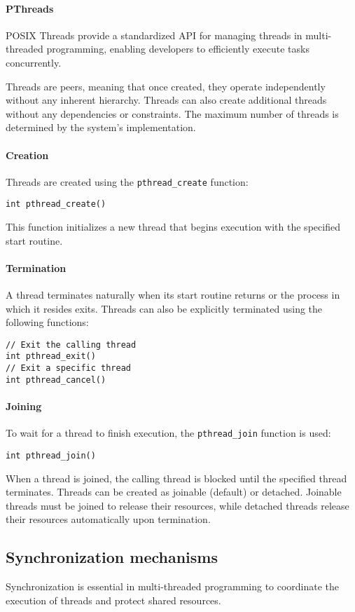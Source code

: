 \paragraph*{PThreads}
POSIX Threads provide a standardized API for managing threads in multi-threaded programming, enabling developers to efficiently execute tasks concurrently.

Threads are peers, meaning that once created, they operate independently without any inherent hierarchy. 
Threads can also create additional threads without any dependencies or constraints. 
The maximum number of threads is determined by the system's implementation.

\paragraph*{Creation}
Threads are created using the \texttt{pthread\_create} function:
\begin{lstlisting}[style=C]
int pthread_create()
\end{lstlisting}
This function initializes a new thread that begins execution with the specified start routine.

\paragraph*{Termination}
A thread terminates naturally when its start routine returns or the process in which it resides exits. 
Threads can also be explicitly terminated using the following functions:
\begin{lstlisting}[style=C]
// Exit the calling thread
int pthread_exit()
// Exit a specific thread
int pthread_cancel()
\end{lstlisting}

\paragraph*{Joining}
To wait for a thread to finish execution, the \texttt{pthread\_join} function is used:
\begin{lstlisting}[style=C]
int pthread_join()
\end{lstlisting}
When a thread is joined, the calling thread is blocked until the specified thread terminates. 
Threads can be created as joinable (default) or detached. 
Joinable threads must be joined to release their resources, while detached threads release their resources automatically upon termination.

\subsection{Synchronization mechanisms}
Synchronization is essential in multi-threaded programming to coordinate the execution of threads and protect shared resources. 

